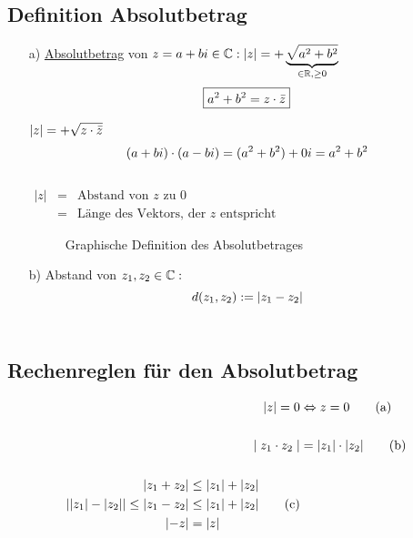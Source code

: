 \subsection{Definition Absolutbetrag}
\begin{enumerate}
\item[a)] \underline{Absolutbetrag} von $z =a+bi \in \mathbb{C}:
\lvert z \rvert = +\underbrace{\sqrt{a^2 +b^2}}_{\in \mathbb{R}, \geq 0}$\\
\begin{equation*}
\boxed{a^2 + b^2 = z \cdot \bar{z}}
\end{equation*}

$\lvert z \rvert= +\sqrt{z \cdot \bar{z}}$\\
$$(a+bi) \cdot (a-bi) = (a^2 +b^2) + 0i = a^2 + b^2$$\\
    $
  \begin{array}{lcl}
  \lvert z \rvert &=& \text{Abstand von $z$ zu 0}\\
  &=& \text{L\"ange des Vektors, der $z$ entspricht}
  \end{array}$\\
\begin{figure}[h!]
\centering
{}
  \caption[Absolutbetrag]{Graphische Definition des Absolutbetrages}
  \end{figure}
  \item[b)]Abstand von $z_1,z_2 \in \mathbb{C}:$\\
 $$ d(z_1,z_2):= \lvert z_1 - z_2 \rvert$$\\
\end{enumerate}
\subsection{Rechenreglen f\"ur den Absolutbetrag}
\begin{align}
\lvert z \rvert = 0 &\Leftrightarrow z =0 \tag{a}\\\notag \\
\mid z_1 \cdot z_2 \mid &= \lvert z_1 \rvert \cdot \lvert z_2 \rvert \tag{b}\\\notag \\
\begin{split}
\lvert z_1 + z_2 \rvert &\leq \lvert z_1 \rvert + \lvert z_2 \rvert\\
\lvert \lvert z_1 \rvert -\lvert z_2 \rvert \rvert \leq \lvert z_1 - z_2 \rvert &\leq \lvert z_1 \rvert + \lvert z_2 \rvert\\
\lvert -z \rvert &= \lvert z \rvert
\end{split}\tag{c}
\end{align}
\newpage
